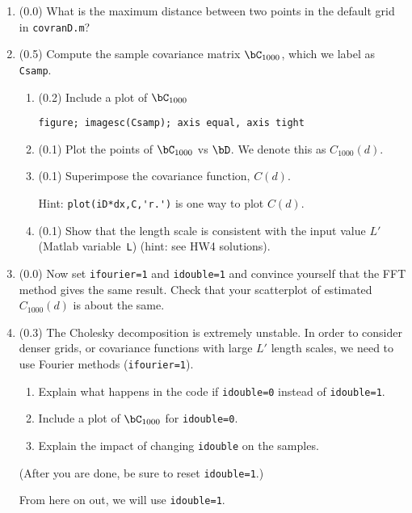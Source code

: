 \documentclass[11pt,titlepage,fleqn]{article}
\begin{document}
\begin{enumerate}
\item (0.0) What is the maximum distance between two points in the default grid in \verb+covranD.m+?

\item (0.5) Compute the sample covariance matrix $\bC_{1000}$, which we label as \verb+Csamp+.

\begin{enumerate}
\item (0.2) Include a plot of $\bC_{1000}$

\verb+figure; imagesc(Csamp); axis equal, axis tight+

\item (0.1) Plot the points of $\bC_{1000}$ vs $\bD$. We denote this as $C_{1000}(d)$.


\item (0.1) Superimpose the covariance function, $C(d)$.

Hint: \verb+plot(iD*dx,C,'r.')+ is one way to plot $C(d)$.

\item (0.1) Show that the length scale is consistent with the input value $L'$ (Matlab variable~\verb+L+) (hint: see HW4 solutions).
\end{enumerate}

\item (0.0) Now set \verb+ifourier=1+ and \verb+idouble=1+ and convince yourself that the FFT method gives the same result. Check that your scatterplot of estimated $C_{1000}(d)$ is about the same.

\item (0.3) The Cholesky decomposition is extremely unstable. In order to consider denser grids, or covariance functions with large $L'$ length scales, we need to use Fourier methods (\verb+ifourier=1+).

\begin{enumerate}
\item Explain what happens in the code if \verb+idouble=0+ instead of \verb+idouble=1+.
\item Include a plot of $\bC_{1000}$ for \verb+idouble=0+.
\item Explain the impact of changing \verb+idouble+ on the samples.
\end{enumerate}
%
(After you are done, be sure to reset \verb+idouble=1+.)

From here on out, we will use \verb+idouble=1+.


\end{enumerate}
\end{document}
